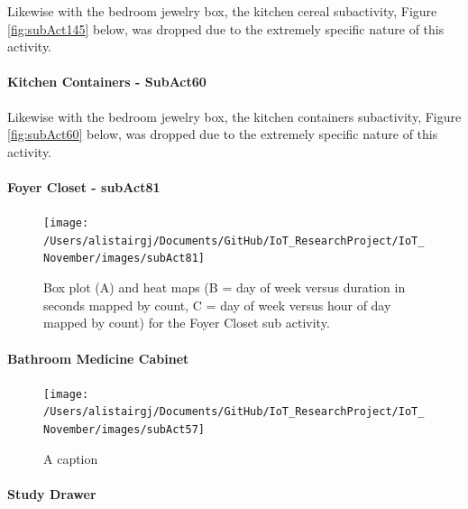 \documentclass[11pt,]{article}
\let\oldparagraph\paragraph
\renewcommand{\paragraph}[1]{\oldparagraph{#1}\mbox{}}
\begin{document}
Likewise with the bedroom jewelry box, the kitchen cereal subactivity,
Figure \ref{fig:subAct145} below, was dropped due to the extremely
specific nature of this activity.

\hypertarget{kitchen-containers---subact60}{%
\paragraph{Kitchen Containers -
SubAct60}\label{kitchen-containers---subact60}}

Likewise with the bedroom jewelry box, the kitchen containers
subactivity, Figure \ref{fig:subAct60} below, was dropped due to the
extremely specific nature of this activity.

\hypertarget{foyer-closet---subact81}{%
\paragraph{Foyer Closet - subAct81}\label{foyer-closet---subact81}}

\begin{figure}[H]

{\centering \texttt{[image: /Users/alistairgj/Documents/GitHub/IoT\_ResearchProject/IoT\_November/images/subAct81]} 

}

\caption{Box plot (A) and heat maps (B = day of week versus duration in seconds mapped by count, C = day of week versus hour of day mapped by count) for the Foyer Closet sub activity.}\label{fig:subAct81}
\end{figure}

\hypertarget{bathroom-medicine-cabinet}{%
\paragraph{Bathroom Medicine Cabinet}\label{bathroom-medicine-cabinet}}

\begin{figure}[H]

{\centering \texttt{[image: /Users/alistairgj/Documents/GitHub/IoT\_ResearchProject/IoT\_November/images/subAct57]} 

}

\caption{A caption}\label{fig:subAct57}
\end{figure}

\hypertarget{study-drawer}{%
\paragraph{Study Drawer}\label{study-drawer}}
\end{document}
